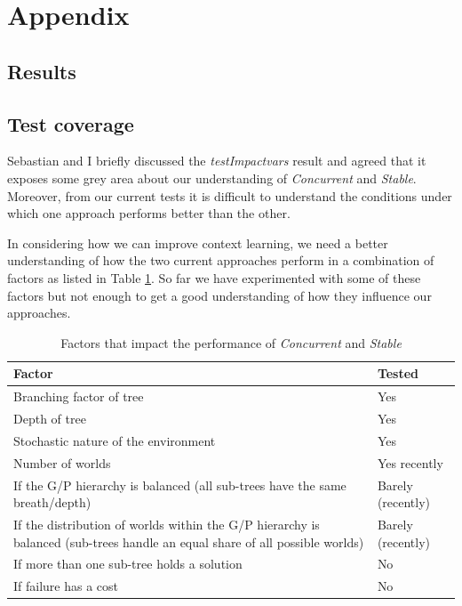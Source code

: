\documentclass[a4paper]{article}
\newcommand{\cc}{\emph{Concurrent}\xspace}
\newcommand{\st}{\emph{Stable}\xspace}
\newcommand{\tiv}{\emph{testImpactvars}\xspace}
\begin{document}

 


\appendix
\section{Appendix}


\subsection{Results}
\label{sec:results1}





\subsection{Test coverage}
Sebastian and I briefly discussed the \tiv result and agreed that it exposes some grey area about our understanding of \cc and \st. Moreover, from our current tests it is difficult to understand the conditions under which one approach performs better than the other. 

In considering how we can improve context learning, we need a better understanding of how the two current approaches perform in a combination of factors as listed in Table \ref{tab:perofrmanceFactors}. So far we have experimented with some of these factors but not enough to get a good understanding of how they influence our approaches.

\begin{table}[!htb]
  \begin{tabular}{ p{} l }
    \hline
    Factor & Tested\\ \hline
    Branching factor of tree & Yes\\
    Depth of tree & Yes\\
    Stochastic nature of the environment & Yes\\
    Number of worlds & Yes recently\\
    If the G/P hierarchy is balanced (all sub-trees have the same breath/depth) & Barely (recently)\\
    If the distribution of worlds within the G/P hierarchy is balanced (sub-trees handle an equal share of all possible worlds) & Barely (recently)\\
    If more than one sub-tree holds a solution & No\\
    If failure has a cost & No\\
    \hline
  \end{tabular}
  \caption{Factors that impact the performance of \cc and \st}
  \label{tab:perofrmanceFactors}
\end{table}
\end{document}
